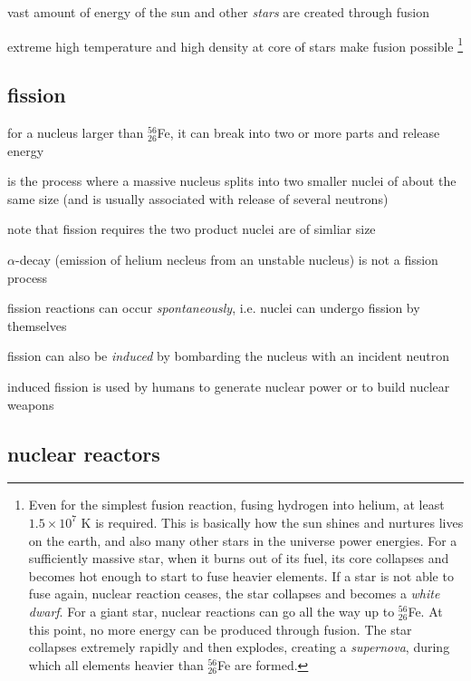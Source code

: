 \cmt vast amount of energy of the sun and other \emph{stars} are created through fusion

extreme high temperature and high density at core of stars make fusion possible
\footnote{Even for the simplest fusion reaction, fusing hydrogen into helium, at least $1.5\times 10^7 \text{ K}$ is required. This is basically how the sun shines and nurtures lives on the earth, and also many other stars in the universe power energies. For a sufficiently massive star, when it burns out of its fuel, its core collapses and becomes hot enough to start to fuse heavier elements. If a star is not able to fuse again, nuclear reaction ceases, the star collapses and becomes a \emph{white dwarf}. For a giant star, nuclear reactions can go all the way up to $^{56}_{26}$Fe. At this point, no more energy can be produced through fusion. The star collapses extremely rapidly and then explodes, creating a \emph{supernova}, during which all elements heavier than $^{56}_{26}$Fe are formed. \piste}


\subsection{fission}

for a nucleus larger than $^{56}_{26}$Fe, it can break into two or more parts and release energy

\begin{ilight}
	 is the process where a massive nucleus splits into two smaller nuclei of about the same size (and is usually associated with release of several neutrons)
\end{ilight}

\cmt note that fission requires the two product nuclei are of simliar size

$\alpha$-decay (emission of helium necleus from an unstable nucleus) is not a fission process

\cmt fission reactions can occur \emph{spontaneously}, i.e. nuclei can undergo fission by themselves

fission can also be \emph{induced} by bombarding the nucleus with an incident neutron

induced fission is used by humans to generate nuclear power or to build nuclear weapons

\subsection*{nuclear reactors \piste}

